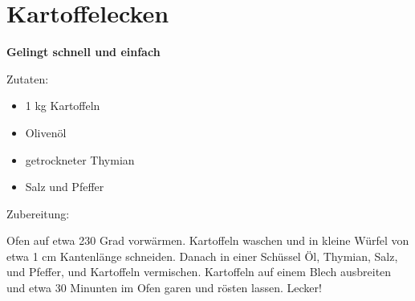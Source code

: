 \section{Kartoffelecken}

\textbf{Gelingt schnell und einfach}

Zutaten:
\begin{itemize}
    \item 1 kg Kartoffeln
    \item Olivenöl
    \item getrockneter Thymian
    \item Salz und Pfeffer
\end{itemize}

\noindent Zubereitung:

\noindent Ofen auf etwa 230 Grad vorwärmen. Kartoffeln waschen und in kleine Würfel von etwa 1 cm Kantenlänge schneiden. Danach in einer Schüssel Öl, Thymian, Salz, und Pfeffer, und Kartoffeln vermischen. Kartoffeln auf einem Blech ausbreiten und etwa 30 Minunten im Ofen garen und rösten lassen. Lecker!

\newpage
\mbox{}
\vfill
\begin{center}
\end{center}
\vfill
\mbox{ }
\newpage
